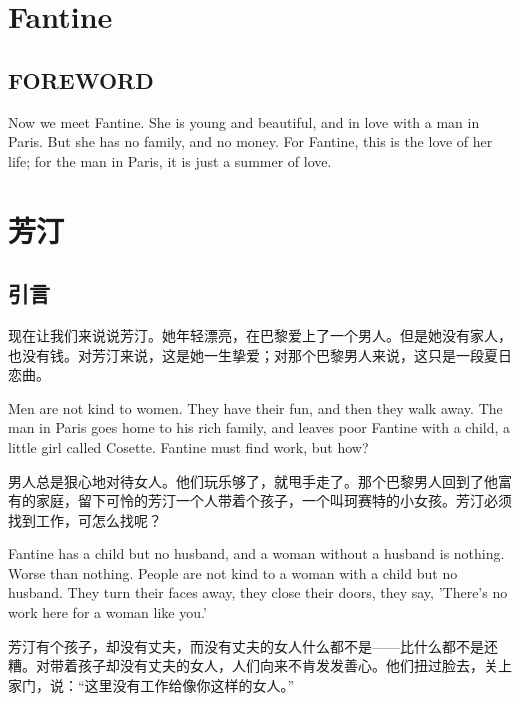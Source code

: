 \documentclass[fontset=ubuntu, zihao=5]{ctexart}
\begin{document}
\clearpage
\begin{paracol}{2}

  \section{Fantine}

  \subsection{FOREWORD}

  Now we meet Fantine. She is young and beautiful, and in love with a man in Paris. But she has no family, and no money. For Fantine, this is the love of her life; for the man in Paris, it is just a summer of love.

  \switchcolumn

  \section*{芳汀}

  \subsection*{引言}


现在让我们来说说芳汀。她年轻漂亮，在巴黎爱上了一个男人。但是她没有家人，也没有钱。对芳汀来说，这是她一生挚爱；对那个巴黎男人来说，这只是一段夏日恋曲。

\switchcolumn*

Men are not kind to women. They have their fun, and then they walk away. The man in Paris goes home to his rich family, and leaves poor Fantine with a child, a little girl called Cosette. Fantine must find work, but how?

\switchcolumn

男人总是狠心地对待女人。他们玩乐够了，就甩手走了。那个巴黎男人回到了他富有的家庭，留下可怜的芳汀一个人带着个孩子，一个叫珂赛特的小女孩。芳汀必须找到工作，可怎么找呢？

\switchcolumn*

Fantine has a child but no husband, and a woman without a husband is nothing. Worse than nothing. People are not kind to a woman with a child but no husband. They turn their faces away, they close their doors, they say, 'There's no work here for a woman like you.'

\switchcolumn

芳汀有个孩子，却没有丈夫，而没有丈夫的女人什么都不是——比什么都不是还糟。对带着孩子却没有丈夫的女人，人们向来不肯发发善心。他们扭过脸去，关上家门，说：“这里没有工作给像你这样的女人。”


\end{paracol}
\end{document}
